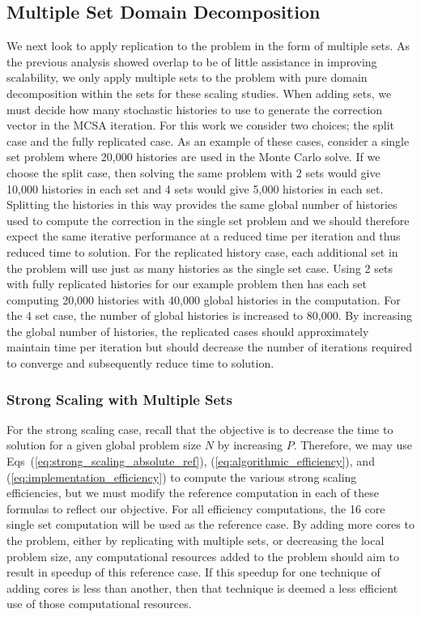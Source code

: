 \documentclass{snamc2013}
\begin{document}
\subsection{Multiple Set Domain Decomposition}
\label{subsec:ms_decomposition}
We next look to apply replication to the problem in the form of
multiple sets. As the previous analysis showed overlap to be of little
assistance in improving scalability, we only apply multiple sets to
the problem with pure domain decomposition within the sets for these
scaling studies. When adding sets, we must decide how many stochastic
histories to use to generate the correction vector in the MCSA
iteration. For this work we consider two choices; the split case and
the fully replicated case. As an example of these cases, consider a
single set problem where 20,000 histories are used in the Monte Carlo
solve. If we choose the split case, then solving the same problem with
2 sets would give 10,000 histories in each set and 4 sets would give
5,000 histories in each set. Splitting the histories in this way
provides the same global number of histories used to compute the
correction in the single set problem and we should therefore expect
the same iterative performance at a reduced time per iteration and
thus reduced time to solution. For the replicated history case, each
additional set in the problem will use just as many histories as the
single set case. Using 2 sets with fully replicated histories for our
example problem then has each set computing 20,000 histories with
40,000 global histories in the computation. For the 4 set case, the
number of global histories is increased to 80,000. By increasing the
global number of histories, the replicated cases should approximately
maintain time per iteration but should decrease the number of
iterations required to converge and subsequently reduce time to
solution.

\subsubsection{Strong Scaling with Multiple Sets}
\label{subsubsec:ms_strong}
For the strong scaling case, recall that the objective is to decrease
the time to solution for a given global problem size $N$ by increasing
$P$. Therefore, we may use Eqs~(\ref{eq:strong_scaling_absolute_ref}),
(\ref{eq:algorithmic_efficiency}), and
(\ref{eq:implementation_efficiency}) to compute the various strong
scaling efficiencies, but we must modify the reference computation in
each of these formulas to reflect our objective. For all efficiency
computations, the 16 core single set computation will be used as the
reference case. By adding more cores to the problem, either by
replicating with multiple sets, or decreasing the local problem size,
any computational resources added to the problem should aim to result
in speedup of this reference case. If this speedup for one technique
of adding cores is less than another, then that technique is deemed a
less efficient use of those computational resources.
\end{document}
